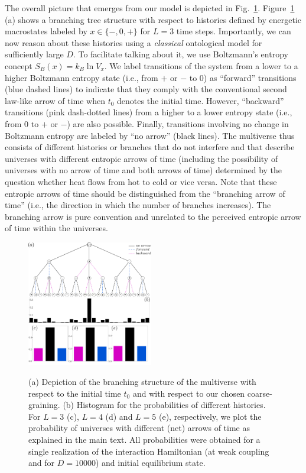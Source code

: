 \documentclass[pre,onecolumn,12pt,aps,longbibliography,nofootinbib]{revtex4-2}
\newcommand{\blue}[1]{#1}
\begin{document}
The overall picture that emerges from our model is depicted in Fig.~\ref{fig tree}. Figure~\ref{fig tree} (a) shows a branching tree structure with respect to histories defined by energetic macrostates labeled by $x\in\{-,0,+\}$ for $L=3$ time steps. Importantly, we can now reason about these histories using a \emph{classical} ontological model for sufficiently large $D$. To facilitate talking about it, we use Boltzmann's entropy concept $S_B(x) = k_B\ln V_x$. We label transitions of the system from a lower to a higher Boltzmann entropy state (i.e., from $+$ or $-$ to $0$) as ``forward'' transitions (blue dashed lines) to indicate that they comply with the conventional \blue{second law-like} arrow of time when $t_0$ denotes the initial time. However, ``backward'' transitions (pink dash-dotted lines) from a higher to a lower entropy state (i.e., from $0$ to $+$ or $-$) are also possible. Finally, transitions involving no change in Boltzmann entropy are labeled by ``no arrow'' (black lines). The multiverse thus consists of different histories or branches that do not interfere and that describe universes with different \blue{entropic} arrows of time (including the possibility of universes with no arrow of time and both arrows of time) determined by the question whether heat flows from hot to cold or vice versa. \blue{Note that these entropic arrows of time should be distinguished from the ``branching arrow of time'' (i.e., the direction in which the number of branches increases). The branching arrow is pure convention and unrelated to the perceived entropic arrow of time within the universes.}

\begin{figure}[t]
 \centering\includegraphics[width=0.49\textwidth,clip=true]{tree2.pdf}
 \label{fig tree}
 \caption{(a) Depiction of the branching structure of the multiverse with respect to the initial time $t_0$ and with respect to our chosen coarse-graining. (b) Histogram for the probabilities of different histories. For $L=3$ (c), $L=4$ (d) and $L=5$ (e), respectively, we plot the probability of universes with different (net) arrows of time as explained in the main text. All probabilities were obtained for a single realization of the interaction Hamiltonian (at weak coupling and for $D=10000$) and initial equilibrium state. }
\end{figure}
\end{document}

